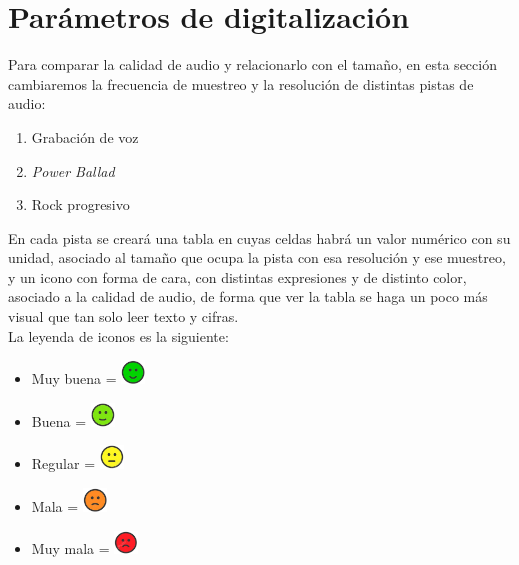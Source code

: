 \documentclass[11pt,a4paper]{article}
\begin{document}
\newpage

\section{Parámetros de digitalización}

Para comparar la calidad de audio y relacionarlo con el tamaño, en esta sección cambiaremos la frecuencia de muestreo y la resolución de distintas pistas de audio:

\begin{enumerate}
	\item Grabación de voz
	\item \textit{Power Ballad}
	\item Rock progresivo
\end{enumerate}

En cada pista se creará una tabla en cuyas celdas habrá un valor numérico con su unidad, asociado al tamaño que ocupa la pista con esa resolución y ese muestreo, y un icono con forma de cara, con distintas expresiones y de distinto color, asociado a la calidad de audio, de forma que ver la tabla se haga un poco más visual que tan solo leer texto y cifras.\\

La leyenda de iconos es la siguiente:

\begin{itemize}
	\item Muy buena = \includegraphics[width=0.05\textwidth]{mb.png}
	\item Buena = \includegraphics[width=0.05\textwidth]{b.png}
	\item Regular = \includegraphics[width=0.05\textwidth]{r.png}
	\item Mala = \includegraphics[width=0.05\textwidth]{m.png}
	\item Muy mala = \includegraphics[width=0.05\textwidth]{mm.png}
\end{itemize}
\end{document}
